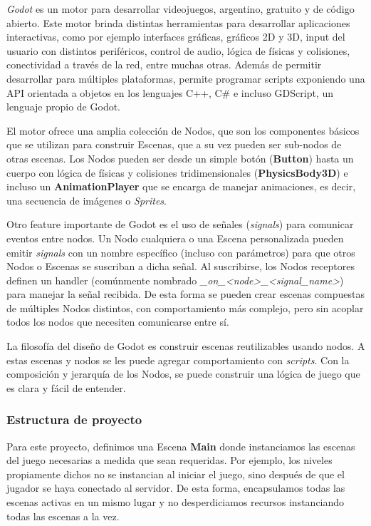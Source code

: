\textit{Godot} es un motor para desarrollar videojuegos, argentino, gratuito y de código abierto. 
Este motor brinda distintas herramientas para desarrollar aplicaciones interactivas, como por ejemplo 
interfaces gráficas, gráficos 2D y 3D, input del usuario con distintos periféricos, control de audio, 
lógica de físicas y colisiones, conectividad a través de la red, entre muchas otras.
Además de permitir desarrollar para múltiples plataformas, permite programar scripts exponiendo una 
API orientada a objetos en los lenguajes C++, C\# e incluso GDScript, un lenguaje propio de Godot.

El motor ofrece una amplia colección de Nodos, que son los componentes básicos que se utilizan para 
construir Escenas, que a su vez pueden ser sub-nodos de otras escenas. Los Nodos pueden ser desde un 
simple botón (\textbf{Button}) hasta un cuerpo con lógica de físicas y colisiones tridimensionales 
(\textbf{PhysicsBody3D}) e incluso un \textbf{AnimationPlayer} que se encarga de manejar animaciones, 
es decir, una secuencia de imágenes o \textit{Sprites}.

Otro feature importante de Godot es el uso de señales (\textit{signals}) para comunicar eventos entre nodos.
Un Nodo cualquiera o una Escena personalizada pueden emitir \textit{signals} con un nombre específico 
(incluso con parámetros) para que otros Nodos o Escenas se suscriban a dicha señal. Al suscribirse, los 
Nodos receptores definen un handler (comúnmente nombrado \textit{_on_<node>_<signal_name>}) para manejar 
la señal recibida. De esta forma se pueden crear escenas compuestas de múltiples Nodos distintos, con 
comportamiento más complejo, pero sin acoplar todos los nodos que necesiten comunicarse entre sí.

La filosofía del diseño de Godot es construir escenas reutilizables usando nodos. A estas escenas y 
nodos se les puede agregar comportamiento con \textit{scripts}. Con la composición y jerarquía de los Nodos, 
se puede construir una lógica de juego que es clara y fácil de entender.

\subsubsection{Estructura de proyecto}

Para este proyecto, definimos una Escena \textbf{Main} donde instanciamos las escenas del juego necesarias 
a medida que sean requeridas. Por ejemplo, los niveles propiamente dichos no se instancian al iniciar el 
juego, sino después de que el jugador se haya conectado al servidor. De esta forma, encapsulamos todas las 
escenas activas en un mismo lugar y no desperdiciamos recursos instanciando todas las escenas a la vez.

